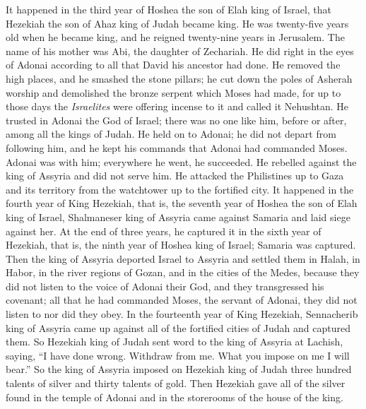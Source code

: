 \begin{biblechapter} %
 It happened in the third year of Hoshea the son of Elah king of Israel, that Hezekiah the son of Ahaz king of Judah became king.
\verse He was twenty-five years old when he became king, and he reigned twenty-nine years in Jerusalem. The name of his mother was Abi, the daughter of Zechariah.
\verse He did right in the eyes of Adonai according to all that David his ancestor had done.
\verse He removed the high places, and he smashed the stone pillars; he cut down the poles of Asherah worship and demolished the bronze serpent which Moses had made, for up to those days the \textit{Israelites} were offering incense to it and called it Nehushtan.
\verse He trusted in Adonai the God of Israel; there was no one like him, before or after, among all the kings of Judah.
\verse He held on to Adonai; he did not depart from following him, and he kept his commands that Adonai had commanded Moses.
\verse Adonai was with him; everywhere he went, he succeeded. He rebelled against the king of Assyria and did not serve him.
\verse He attacked the Philistines up to Gaza and its territory from the watchtower up to the fortified city.
\verse It happened in the fourth year of King Hezekiah, that is, the seventh year of Hoshea the son of Elah king of Israel, Shalmaneser king of Assyria came against Samaria and laid siege against her.
\verse At the end of three years, he captured it in the sixth year of Hezekiah, that is, the ninth year of Hoshea king of Israel; Samaria was captured.
\verse Then the king of Assyria deported Israel to Assyria and settled them in Halah, in Habor, in the river regions of Gozan, and in the cities of the Medes,
\verse because they did not listen to the voice of Adonai their God, and they transgressed his covenant; all that he had commanded Moses, the servant of Adonai, they did not listen to nor did they obey.
 In the fourteenth year of King Hezekiah, Sennacherib king of Assyria came up against all of the fortified cities of Judah and captured them.
\verse So Hezekiah king of Judah sent word to the king of Assyria at Lachish, saying, “I have done wrong. Withdraw from me. What you impose on me I will bear.” So the king of Assyria imposed on Hezekiah king of Judah three hundred talents of silver and thirty talents of gold.
\verse Then Hezekiah gave all of the silver found in the temple of Adonai and in the storerooms of the house of the king.

\end{biblechapter}
